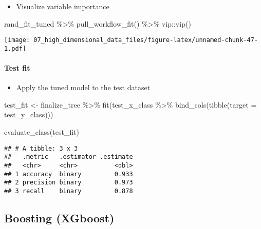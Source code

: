 \documentclass[
]{book}
\newenvironment{Shaded}{\begin{snugshade}}{\end{snugshade}}
\newcommand{\AttributeTok}[1]{\textcolor[rgb]{0.77,0.63,0.00}{#1}}
\newcommand{\FunctionTok}[1]{\textcolor[rgb]{0.00,0.00,0.00}{#1}}
\newcommand{\NormalTok}[1]{#1}
\newcommand{\OtherTok}[1]{\textcolor[rgb]{0.56,0.35,0.01}{#1}}
\newcommand{\SpecialCharTok}[1]{\textcolor[rgb]{0.00,0.00,0.00}{#1}}
\providecommand{\tightlist}{%
  \setlength{\itemsep}{0pt}\setlength{\parskip}{0pt}}
\begin{document}
\begin{itemize}
\tightlist
\item
  Visualize variable importance
\end{itemize}

\begin{Shaded}
\begin{Highlighting}[]
\NormalTok{rand\_fit\_tuned }\SpecialCharTok{\%\textgreater{}\%}
  \FunctionTok{pull\_workflow\_fit}\NormalTok{() }\SpecialCharTok{\%\textgreater{}\%}
\NormalTok{  vip}\SpecialCharTok{::}\FunctionTok{vip}\NormalTok{()}
\end{Highlighting}
\end{Shaded}

\texttt{[image: 07\_high\_dimensional\_data\_files/figure-latex/unnamed-chunk-47-1.pdf]}

\hypertarget{test-fit-2}{%
\paragraph{Test fit}\label{test-fit-2}}

\begin{itemize}
\tightlist
\item
  Apply the tuned model to the test dataset
\end{itemize}

\begin{Shaded}
\begin{Highlighting}[]
\NormalTok{test\_fit }\OtherTok{\textless{}{-}}\NormalTok{ finalize\_tree }\SpecialCharTok{\%\textgreater{}\%}
  \FunctionTok{fit}\NormalTok{(test\_x\_class }\SpecialCharTok{\%\textgreater{}\%} \FunctionTok{bind\_cols}\NormalTok{(}\FunctionTok{tibble}\NormalTok{(}\AttributeTok{target =}\NormalTok{ test\_y\_class)))}

\FunctionTok{evaluate\_class}\NormalTok{(test\_fit)}
\end{Highlighting}
\end{Shaded}

\begin{verbatim}
## # A tibble: 3 x 3
##   .metric   .estimator .estimate
##   <chr>     <chr>          <dbl>
## 1 accuracy  binary         0.933
## 2 precision binary         0.973
## 3 recall    binary         0.878
\end{verbatim}

\hypertarget{boosting-xgboost}{%
\subsection{Boosting (XGboost)}\label{boosting-xgboost}}
\end{document}
